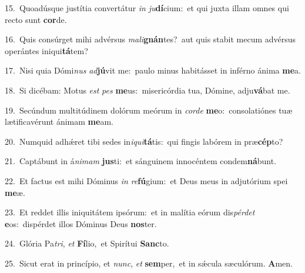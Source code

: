 {\numbfont\textcolor{\numbcolor}{15.}}~Quoadúsque justítia convertátur \textit{in} \textit{ju}\-\textbf{dí}cium:~\star et qui juxta illam omnes qui recto sunt \textbf{cor}\-de.\par
{\numbfont\textcolor{\numbcolor}{16.}}~Quis consúrget mihi advérsus \textit{ma}\-\textit{li}\textbf{gnán}tes?~\star aut quis stabit mecum advérsus operántes iniqui\-\textbf{tá}\-tem?\par
{\numbfont\textcolor{\numbcolor}{17.}}~Nisi quia Dómi\textit{nus} \textit{ad}\-\textbf{jú}vit me:~\star paulo minus habitásset in inférno ánima \textbf{me}\-a.\par
{\numbfont\textcolor{\numbcolor}{18.}}~Si dicébam: Motus \textit{est} \textit{pes} \textbf{me}\-us:~\star misericórdia tua, Dómine, adju\-\textbf{vá}\-bat me.\par
{\numbfont\textcolor{\numbcolor}{19.}}~Secúndum multitúdinem dolórum meórum in \textit{cor}\-\textit{de} \textbf{me}\-o:~\star consolatiónes tuæ lætificavérunt ánimam \textbf{me}\-am.\par
{\numbfont\textcolor{\numbcolor}{20.}}~Numquid adhǽret tibi sedes in\-\textit{i}\-\textit{qui}\textbf{tá}tis:~\star qui fingis labórem in præ\-\textbf{cép}\-to?\par
{\numbfont\textcolor{\numbcolor}{21.}}~Captábunt in á\-\textit{ni}\-\textit{mam} \textbf{jus}\-ti:~\star et sánguinem innocéntem condem\-\textbf{ná}\-bunt.\par
{\numbfont\textcolor{\numbcolor}{22.}}~Et factus est mihi Dóminus \textit{in} \textit{re}\-\textbf{fú}gium:~\star et Deus meus in adjutórium spei \textbf{me}\-æ.\par
{\numbfont\textcolor{\numbcolor}{23.}}~Et reddet illis iniquitátem ipsórum:~\dagger et in malítia eórum dis\-\textit{pér}\-\textit{det} \textbf{e}\-os:~\star dispérdet illos Dóminus Deus \textbf{nos}\-ter.\par
{\numbfont\textcolor{\numbcolor}{24.}}~Glória Pa\-\textit{tri}\-, \textit{et} \textbf{Fí}\-lio,~\star et Spirítui \textbf{Sanc}\-to.\par
{\numbfont\textcolor{\numbcolor}{25.}}~Sicut erat in princípio, et \textit{nunc}\-, \textit{et} \textbf{sem}\-per,~\star et in sǽcula sæculórum. \textbf{A}\-men.\par
